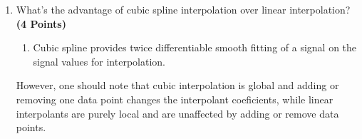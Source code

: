 \documentclass[12pt, xcolor=dvipsnames,svgnames,x11names]{article}
\begin{document}
\begin{enumerate}
\item What's the advantage of cubic spline interpolation over linear interpolation?  \hfill \textbf{(4 Points)}
\begin{tcolorbox}[
    enhanced,breakable,
    colback=androidBlueLight!80,
    colframe=androidBlue,
    arc=5pt,
    boxrule=1pt,
    title=\textbf{Answer},
    fonttitle=\bfseries,
    coltitle=black,
    top=10pt,
    bottom=8pt,
    left=8pt,
    right=8pt,
    attach boxed title to top left={xshift=10pt, yshift=-\tcboxedtitleheight/2},
    boxed title style={
    colback=androidBlue,    
        colframe=androidBlue,
        arc=3pt,
        boxrule=0pt,
        left=6pt, right=6pt,
        top=3pt, bottom=3pt
    }
    ]


\begin{enumerate}
\item Cubic spline provides twice differentiable smooth fitting of a signal on the signal values for interpolation.
\end{enumerate}
However, one should note that cubic interpolation is global and adding or removing one data point changes the interpolant coeficients, while linear interpolants are purely local and are unaffected by adding or remove  data points.
    
\end{tcolorbox}

\end{enumerate}
\end{document}
